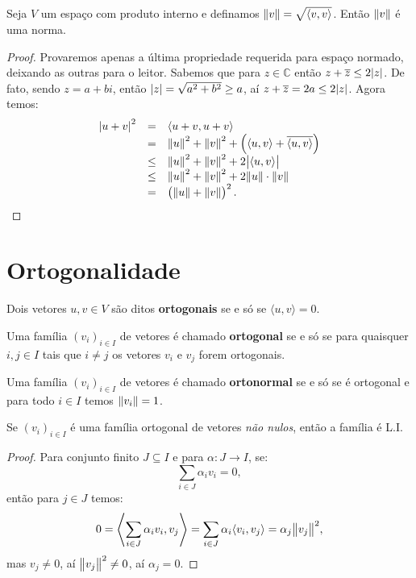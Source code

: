 \documentclass[11pt,twoside,a4paper]{book}
\begin{document}
\begin{proposicao}
Seja $V$ um espaço com produto interno e definamos $\norm{v}=\sqrt{\langle v,v\rangle}$. Então $\norm{v}$ é uma norma.
\end{proposicao}
\begin{proof}
Provaremos apenas a última propriedade requerida para espaço normado, deixando as outras para o leitor. Sabemos que para $z\in\mathbb{C}$ então $z+\overline{z}\leq 2\abs{z}$. De fato, sendo $z=a+bi$, então $\abs{z}=\sqrt{a^2+b^2}\geq a$, aí $z+\overline{z}=2a\leq 2\abs{z}$. Agora temos:
\[
\begin{array}{rcl}
\abs{u+v}^2&=&\langle u+v,u+v\rangle\\
&=&\norm{u}^2+\norm{v}^2+\left(\langle u,v\rangle+\overline{\langle u,v\rangle}\right)\\
&\leq&\norm{u}^2+\norm{v}^2+2\abs{\langle u,v\rangle}\\
&\leq&\norm{u}^2+\norm{v}^2+2\norm{u}\cdot\norm{v}\\
&=&\left(\norm{u}+\norm{v}\right)^2.
\end{array}
\]
\end{proof}

\section{Ortogonalidade}

\begin{definicao}
Dois vetores $u,v\in V$ são ditos \textbf{ortogonais} se e só se $\langle u,v\rangle=0$.

\smallskip
\noindent
Uma família $(v_i)_{i\in I}$ de vetores é chamado \textbf{ortogonal} se e só se para quaisquer $i,j\in I$ tais que $i\neq j$ os vetores $v_i$ e $v_j$ forem ortogonais.

\smallskip
\noindent
Uma família $(v_i)_{i\in I}$ de vetores é chamado \textbf{ortonormal} se e só se é ortogonal e para todo $i\in I$ temos $\norm{v_i}=1$.
\end{definicao}

\begin{proposicao}
Se $(v_i)_{i\in I}$ é uma família ortogonal de vetores \emph{não nulos}, então a família é L.I.
\end{proposicao}
\begin{proof}
Para conjunto finito $J\subseteq I$ e para $\alpha:J\rightarrow I$, se:
\[
\sum_{i\in J}\alpha_iv_i=0,
\]
então para $j\in J$ temos:
\[
0=\left\langle\sum_{i\in J}\alpha_iv_i,v_j\right\rangle=\sum_{i\in J}\alpha_i\langle v_i,v_j\rangle=\alpha_j\norm{v_j}^2,
\]
mas $v_j\neq 0$, aí $\norm{v_j}^2\neq 0$, aí $\alpha_j=0$.
\end{proof}
\end{document}
